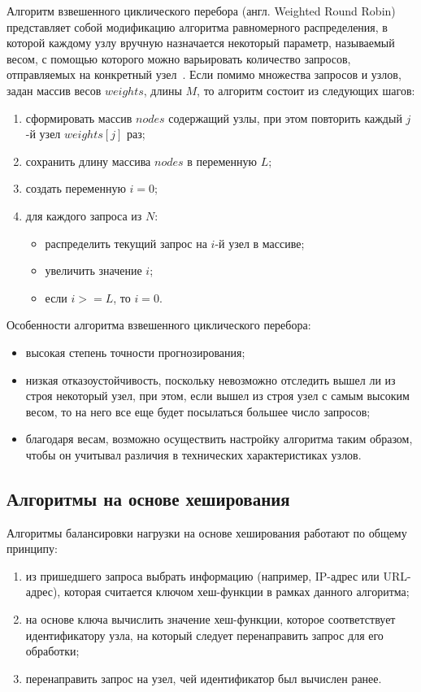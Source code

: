 Алгоритм взвешенного циклического перебора (англ. Weighted Round Robin) представляет собой модификацию алгоритма равномерного распределения, в которой каждому узлу вручную назначается некоторый параметр, называемый весом, с помощью которого можно варьировать количество запросов, отправляемых на конкретный узел~\cite{part_algos}.
Если помимо множества запросов и узлов, задан массив весов $weights$, длины $M$, то алгоритм состоит из следующих шагов:
\begin{enumerate}
	\item сформировать массив $nodes$ содержащий узлы, при этом повторить каждый $j$-й узел $weights[j]$ раз;
	\item сохранить длину массива $nodes$ в переменную $L$;
	\item создать переменную $i = 0$;
	\item для каждого запроса из $N$:
	\begin{itemize}
		\item распределить текущий запрос на $i$-й узел в массиве;
		\item увеличить значение $i$;
		\item если $i >= L$, то $i = 0$.
	\end{itemize}	
\end{enumerate}


Особенности алгоритма взвешенного циклического перебора:
\begin{itemize}
	\item высокая степень точности прогнозирования;
	\item низкая отказоустойчивость, поскольку невозможно отследить вышел ли из строя некоторый узел, при этом, если вышел из строя узел с самым высоким весом, то на него все еще будет посылаться большее число запросов;
	\item благодаря весам, возможно осуществить настройку алгоритма таким образом, чтобы он учитывал различия в технических характеристиках узлов.
\end{itemize}

\subsection{Алгоритмы на основе хеширования}

Алгоритмы балансировки нагрузки на основе хеширования работают по общему принципу:
\begin{enumerate}
	\item из пришедшего запроса выбрать информацию (например, IP-адрес или URL-адрес), которая считается ключом хеш-функции в рамках данного алгоритма;
	\item на основе ключа вычислить значение хеш-функции, которое соответствует идентификатору узла, на который следует перенаправить запрос для его обработки;
	\item перенаправить запрос на узел, чей идентификатор был вычислен ранее.
\end{enumerate}

